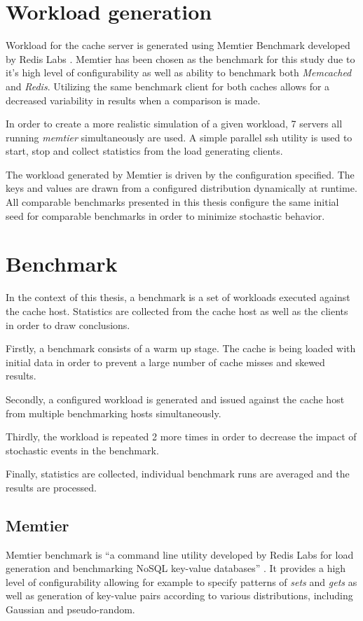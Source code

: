 \section{Workload generation}
\label{methodology:workload-gen}
Workload for the cache server is generated using Memtier Benchmark developed by Redis Labs \cite{memtier}. Memtier has been chosen as the benchmark for this study due to it's high level of configurability as well as ability to benchmark both \textit{Memcached} and \textit{Redis}. Utilizing the same benchmark client for both caches allows for a decreased variability in results when a comparison is made.

In order to create a more realistic simulation of a given workload, 7 servers all running \textit{memtier} simultaneously are used. A simple parallel ssh utility is used to start, stop and collect statistics from the load generating clients.

The workload generated by Memtier is driven by the configuration specified. The keys and values are drawn from a configured distribution dynamically at runtime. All comparable benchmarks presented in this thesis configure the same initial seed for comparable benchmarks in order to minimize stochastic behavior.

\section{Benchmark}

In the context of this thesis, a benchmark is a set of workloads executed against the cache host. Statistics are collected from the cache host as well as the clients in order to draw conclusions.

Firstly, a benchmark consists of a warm up stage. The cache is being loaded with initial data in order to prevent a large number of cache misses and skewed results.

Secondly, a configured workload is generated and issued against the cache host from multiple benchmarking hosts simultaneously.

Thirdly, the workload is repeated 2 more times in order to decrease the impact of stochastic events in the benchmark.

Finally, statistics are collected, individual benchmark runs are averaged and the results are processed.



\subsection{Memtier}
Memtier benchmark is ``a command line utility developed by Redis Labs for load generation and benchmarking NoSQL key-value databases'' \cite{memtier}. It provides a high level of configurability allowing for example to specify patterns of \textit{sets} and \textit{gets} as well as generation of key-value pairs according to various distributions, including Gaussian and pseudo-random.

